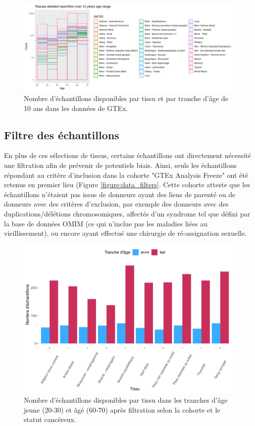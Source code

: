 \begin{figure}[h]
    \centering
    \includegraphics[width=1\textwidth]{img/chap2/chap2_sample_count_by_tissu.png}
    \caption{Nombre d'échantillons disponibles par tissu et par tranche d'âge de 10 ans dans les données de GTEx.}
    \label{figure:sample_count_by_tissu}
\end{figure}


\subsection{Filtre des échantillons}


En plus de ces sélections de tissus, certains échantillons ont directement nécessité une filtration afin de prévenir de potentiels biais. Ainsi, seuls les échantillons répondant au critère d'inclusion dans la cohorte "GTEx Analysis Freeze" ont été retenus en premier lieu (Figure \ref{figure:data_filters}. Cette cohorte atteste que les échantillons n'étaient pas issus de donneurs ayant des liens de parenté ou de donneurs avec des critères d'exclusion, par exemple des donneurs avec des duplications/délétions chromosomiques, affectés d'un syndrome tel que défini par la base de données OMIM  (ce qui n'inclue pas les maladies liées au vieillissement), ou encore ayant effectué une chirurgie de ré-assignation sexuelle. 

\begin{figure}[hb]
    \centering
    \includegraphics[width=1\textwidth]{img/chap2/chap2_sample_count_by_tissu_after_filter.pdf}
    \caption{Nombre d'échantillons disponibles par tissu dans les tranches d'âge jeune (20-30) et âgé (60-70) après filtration selon la cohorte et le statut cancéreux.}
    \label{figure:sample_count_by_tissu_after_filter}
\end{figure}

